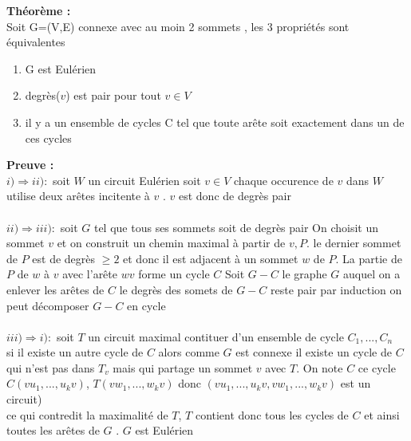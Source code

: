 \documentclass{report}
\newcommand{\preuve}{\textcolor[rgb]{0.95,0.25,0}{Preuve : }}
\newcommand{\Preuve}{\textbf{\preuve}}
\newcommand{\thm}{\textcolor[rgb]{0,0.4,1}{Théorème : }}
\newcommand{\THM}{\textbf{\thm}}
\begin{document}
\THM\\
Soit G=(V,E) connexe avec au moin 2 sommets , les 3 propriétés sont équivalentes\\
\begin{enumerate}
	\item G est Eulérien
	\item degrès($v$) est pair pour tout $v \in V$
	\item il y a un ensemble de cycles C tel que toute arête soit exactement dans un de ces cycles\\
\end{enumerate}
\Preuve\\
\textbf{$i)\Rightarrow ii) :$} soit $W$ un circuit Eulérien soit $v \in V$ chaque occurence de $v$ dans $W$ utilise deux arêtes incitente à $v$ . $v$ est donc de degrès pair\\
\\\textbf{$ii)\Rightarrow iii) :$} soit $G$ tel que tous ses sommets soit de degrès pair On choisit un sommet $v$ et on construit un chemin maximal à partir de $v,P$. le dernier sommet de $P$ est de degrès $\geq 2$ et donc il est adjacent à un sommet $w$ de $P$. La partie de $P$ de $w$ à $v$ avec l'arête $wv$ forme un cycle $C$ Soit $G-C$ le graphe $G$ auquel on a enlever les arêtes de $C$ le degrès des somets de $G-C$ reste pair par induction on peut décomposer $G-C$ en cycle\\
\\\textbf{$iii)\Rightarrow i) :$} soit $T$ un circuit maximal contituer d'un ensemble de cycle $C_1,...,C_n$\\
si il existe un autre cycle de $C$ alors comme $G$ est connexe il existe un cycle de $C$ qui n'est pas dans $T_v$ mais qui partage un sommet $v$ avec $T$. On note $C$ ce cycle\\ $C(vu_1,...,u_kv)$, $T(vw_1,...,w_kv)$ donc  $(vu_1,...,u_kv,vw_1,...,w_kv)$ est un circuit)\\
ce qui contredit la maximalité de $T$, $T$ contient donc tous les cycles de $C$ et ainsi toutes les arêtes de $G$ . $G$ est Eulérien\\
\end{document}
